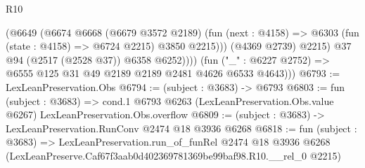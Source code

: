 \begin{lexlean}{R10}
\begin{coremodule}
                  (@6649
                    (@6674
                      @6668
                      (@6679 @3572 @2189)
                      (fun (next : @4158) =>
                      @6303 (fun (state : @4158) => @6724 @2215) @3850 @2215)))
                  (@4369 @2739)
                  @2215)
                @37
                @94
                (@2517 (@2528 @37))
                @6358
                @6252))))
        (fun ("_" : @6227 @2752) => @6555 @125 @31 @49 @2189 @2189 @2481 @4626 @6533 @4643)))
@6793 := LexLeanPreservation.Obs
@6794 := (subject : @3683) -> @6793
@6803 := fun (subject : @3683) =>
  cond.{1} @6793 @6263 (LexLeanPreservation.Obs.value @6267) LexLeanPreservation.Obs.overflow
@6809 := (subject : @3683) -> LexLeanPreservation.RunConv @2474 @18 @3936 @6268
@6818 := fun (subject : @3683) =>
  LexLeanPreservation.run_of_funRel
    @2474
    @18
    @3936
    @6268
    (LexLeanPreserve.Caf67f3aab0d402369781369be99baf98.R10.__rel_0 @2215)
\end{coremodule}
\end{lexlean}
